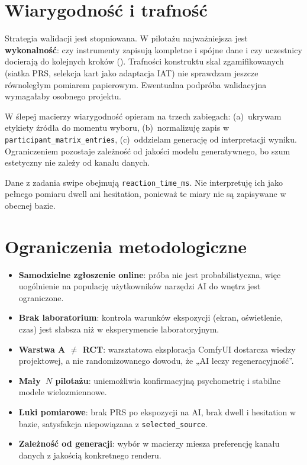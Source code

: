 \section{Wiarygodność i trafność}
\label{ch06:sec:trafnosc}

Strategia walidacji jest stopniowana. W pilotażu najważniejsza jest \textbf{wykonalność}: czy instrumenty zapisują kompletne i spójne dane i czy uczestnicy docierają do kolejnych kroków (). Trafności konstruktu skal zgamifikowanych (siatka PRS, selekcja kart jako adaptacja IAT) nie sprawdzam jeszcze równoległym pomiarem papierowym. Ewentualna podpróba walidacyjna wymagałaby osobnego projektu.

W ślepej macierzy wiarygodność opieram na trzech zabiegach: (a)~ukrywam etykiety źródła do momentu wyboru, (b)~normalizuję zapis w \texttt{participant\_matrix\_entries}, (c)~oddzielam generację od interpretacji wyniku. Ograniczeniem pozostaje zależność od jakości modelu generatywnego, bo szum estetyczny nie zależy od kanału danych.

Dane z zadania swipe obejmują \texttt{reaction\_time\_ms}. Nie interpretuję ich jako pełnego pomiaru dwell ani hesitation, ponieważ te miary nie są zapisywane w obecnej bazie.

\section{Ograniczenia metodologiczne}
\label{ch06:sec:ograniczenia}

\begin{itemize}
  \item \textbf{Samodzielne zgłoszenie online}: próba nie jest probabilistyczna, więc uogólnienie na populację użytkowników narzędzi AI do wnętrz jest ograniczone.
  \item \textbf{Brak laboratorium}: kontrola warunków ekspozycji (ekran, oświetlenie, czas) jest słabsza niż w eksperymencie laboratoryjnym.
  \item \textbf{Warstwa A $\neq$ RCT}: warsztatowa eksploracja ComfyUI dostarcza wiedzy projektowej, a nie randomizowanego dowodu, że „AI leczy regeneracyjność”.
  \item \textbf{Mały~$N$ pilotażu}: uniemożliwia konfirmacyjną psychometrię i stabilne modele wielozmiennowe.
  \item \textbf{Luki pomiarowe}: brak PRS po ekspozycji na AI, brak dwell i hesitation w bazie, satysfakcja niepowiązana z \texttt{selected\_source}.
  \item \textbf{Zależność od generacji}: wybór w macierzy miesza preferencję kanału danych z jakością konkretnego renderu.
\end{itemize}

